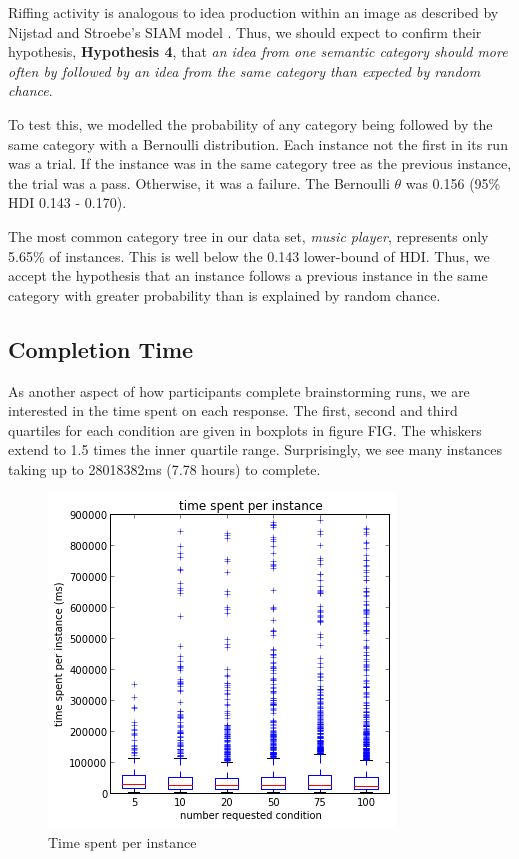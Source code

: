 Riffing activity is analogous to idea production within an image as described by Nijstad and Stroebe's SIAM model \cite{nijstad_how_2006}. Thus, we should expect to confirm their hypothesis, \textbf{Hypothesis 4}, that \emph{an idea from one semantic category should more often by followed by an idea from the same category than expected by random chance}.

To test this, we modelled the probability of any category being followed by the same category with a Bernoulli distribution. Each instance not the first in its run was a trial. If the instance was in the same category tree as the previous instance, the trial was a pass. Otherwise, it was a failure. The Bernoulli $\theta$ was 0.156 (95\% HDI 0.143 - 0.170).

The most common category tree in our data set, \emph{music player}, represents only 5.65\% of instances. This is well below the 0.143 lower-bound of HDI. Thus, we accept the hypothesis that an instance follows a previous instance in the same category with greater probability than is explained by random chance.

\subsection{Completion Time}

As another aspect of how participants complete brainstorming runs, we are interested in the time spent on each response. The first, second and third quartiles for each condition are given in boxplots in figure FIG. The whiskers extend to 1.5 times the inner quartile range. Surprisingly, we see many instances taking up to 28018382ms (7.78 hours) to complete.

\begin{figure}[h]
    \centering
    \includegraphics[width=0.9\columnwidth]{time_spent_condition}
    \caption{Time spent per instance}
\end{figure}

